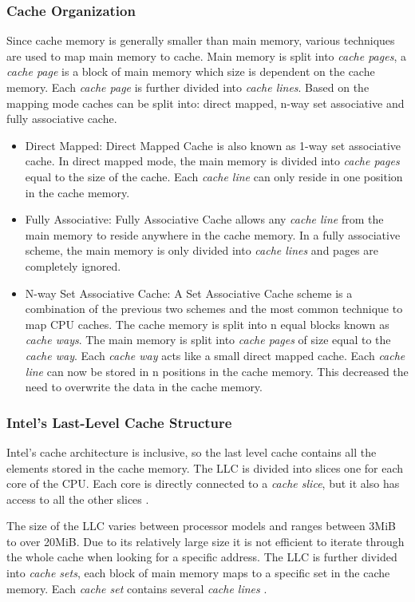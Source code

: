 \documentclass[10pt,a4paper,twoside]{book}
\begin{document}
\subsubsection{Cache Organization}
Since cache memory is generally smaller than main memory, various techniques are used to map main memory to cache. Main memory is split into \textit{cache pages}, a \textit{cache page} is a block of main memory which size is dependent on the cache memory. Each \textit{cache page} is further divided into \textit{cache lines}. Based on the mapping mode caches can be split into: direct mapped, n-way set associative and fully associative cache.
\begin{itemize}
\item Direct Mapped: Direct Mapped Cache is also known as 1-way set associative cache. In direct mapped mode, the main memory is divided into \textit{cache pages} equal to the size of the cache. Each \textit{cache line} can only reside in one position in the cache memory. 
\item Fully Associative: Fully Associative Cache allows any \textit{cache line} from the main memory to reside anywhere in the cache memory. In a fully associative scheme, the main memory is only divided into \textit{cache lines} and pages are completely ignored.
\item N-way Set Associative Cache: A Set Associative Cache scheme is a combination of the previous two schemes and the most common technique to map CPU caches. The cache memory is split into n equal blocks known as \textit{cache ways}. The main memory is split into \textit{cache pages} of size equal to the \textit{cache way}. Each \textit{cache way} acts like a small direct mapped cache. Each \textit{cache line} can now be stored in n positions in the cache memory. This decreased the need to overwrite the data in the cache memory.
\end{itemize}

\subsubsection{Intel's Last-Level Cache Structure}
Intel's cache architecture is inclusive, so the last level cache contains all the elements stored in the cache memory. The LLC is divided into slices one for each core of the CPU. Each core is directly connected to a \textit{cache slice}, but it also has access to all the other slices \cite{oren2015spy}.

The size of the LLC varies between processor models and ranges between 3MiB to over 20MiB. Due to its relatively large size it is not efficient to iterate through the whole cache when looking for a specific address. The LLC is further divided into \textit{cache sets}, each block of main memory maps to a specific set in the cache memory. Each \textit{cache set} contains several \textit{cache lines} \cite{oren2015spy}. 
\end{document}

